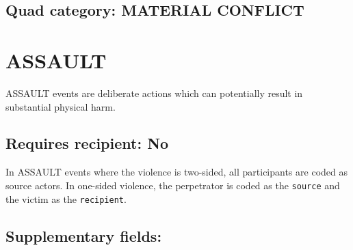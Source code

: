 \documentclass[11pt]{report}
\newcommand{\plcat}[1]{\textsf{#1}}
\begin{document}
 
\subsection{Quad category: MATERIAL CONFLICT}

\newpage  


\section{ASSAULT}

\plcat{ASSAULT} events are deliberate actions which can potentially result in substantial physical harm.

\subsection{Requires recipient: No}

In \plcat{ASSAULT} events where the violence is two-sided, all participants are coded as source actors. In one-sided violence, the perpetrator is coded as the \texttt{source} and the victim as the \texttt{recipient}.

\subsection{Supplementary fields:}
\end{document}
